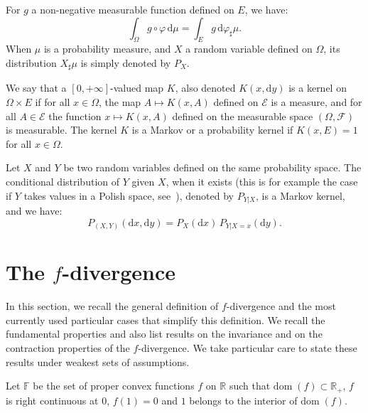 \documentclass[12pt]{article}
\newcommand{\ce}{{\mathcal E}}
\newcommand{\cf}{{\mathcal F}}
\newcommand{\F}{{\mathbb F}}
\newcommand{\R}{{\mathbb R}}
\newcommand{\dom}{{\mathrm{dom}}\;}
\newcommand{\rd}{\mathrm{d}}
\theoremstyle{plain}
\theoremstyle{remark}
\begin{document}
For  $g$ a non-negative  measurable function  defined on
$E$, we have:
\begin{equation}
   \label{eq:chgt-var}
  \int_\Omega g\circ \varphi \, \rd \mu= \int_ E g \, \rd \varphi_\sharp
  \mu.
\end{equation}
When $\mu$ is a probability measure, and $X$ a random variable defined on $\Omega$, its distribution $X_\sharp \mu$ is simply denoted by $P_X$.





\medskip


We say that a $[0, +\infty ]$-valued map $K$, also denoted $K(x, \rd
y)$
is a kernel on $\Omega\times E$
if for all $x\in \Omega$, the map $A\mapsto K(x,A)$ defined on $\ce$ is a  measure, and for all $A\in \ce$ the
   function $x\mapsto K(x, A) $ defined on the measurable space
   $(\Omega, \cf)$ is measurable. The kernel $K$ is a Markov or a probability kernel
   if $K(x, E)=1$ for all $x\in \Omega$.

Let $X$ and $Y$ be two random variables defined on the same probability space.
The  conditional distribution of
$Y$ given $X$, when it  exists  (this is for example the case  if $Y$ takes values
in  a  Polish space,  see~\citet[Theorem~1.23]{k:rm}),  denoted by
$P_{Y \vert X}$, is a Markov kernel, and we have:
\begin{equation}
   \label{eq:proba-decomp}
P_{(X,Y)}(\rd x, \rd y)= P_X(\rd x) \, P_{Y\vert X=x}(\rd y).
\end{equation}



\section{The $f$-divergence}


\label{sec:csiszar_divergence}

In this section, we recall the general definition of $f$-divergence and the most currently
used particular cases that simplify this definition. We recall the fundamental properties
and also list results on the invariance and on the contraction properties of the $f$-divergence. We
take particular care to state these results under weakest sets of assumptions.

Let $\F$ be the set of proper convex functions $f$ on $\R$ such that
$\dom(f) \subset \R_+$, $f$ is right continuous at $0$, $f(1)=0$ and $1$ belongs to the
interior of $\dom (f)$.
\end{document}
